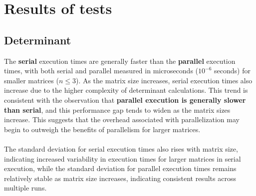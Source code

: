\section{Results of tests}

\subsection{Determinant}
The \textbf{serial} execution times are generally faster than the \textbf{parallel} execution times, with both serial and parallel measured in microseconds ($10^{-6}$ seconds) for smaller matrices ($n \le 3$). As the matrix size increases, serial execution times also increase due to the higher complexity of determinant calculations. This trend is consistent with the observation that \textbf{parallel execution is generally slower than serial}, and this performance gap tends to widen as the matrix sizes increase. This suggests that the overhead associated with parallelization may begin to outweigh the benefits of parallelism for larger matrices.
\\\\
The standard deviation for serial execution times also rises with matrix size, indicating increased variability in execution times for larger matrices in serial execution, while the standard deviation for parallel execution times remains relatively stable as matrix size increases, indicating consistent results across multiple runs.

